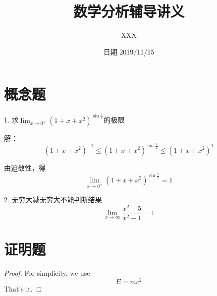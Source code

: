 \documentclass[12pt, a4paper]{ctexart}
\title{数学分析辅导讲义}
\date{日期 2019/11/15}
\author{XXX}
\begin{document}
\maketitle{}

\section{概念题}
    \begin{flushleft} %
    1. 求$
    \lim _{x \rightarrow 0^{+}}\left(1+x+x^{2}\right)^{\sin \frac{1}{x}}
    $的极限

    解：
    \[
    \left(1+x+x^{2}\right)^{-1} \leqslant\left(1+x+x^{2}\right)^{\sin \frac{1}{x}} \leqslant\left(1+x+x^{2}\right)^{1}
    \]

    由迫敛性，得$$\lim _{x \rightarrow 0^{+}} (1+x+x^2)^{\sin \frac{1}{x}} = 1$$


    2. 无穷大减无穷大不能判断结果
    \[
    \lim _{x \rightarrow \infty} \frac{x^{2}-5}{x^{2}-1}=1
    \]
    \end{flushleft}

\section{证明题}
    \begin{proof} %
    For simplicity, we use
    \[
    E=mc^2
    \]
    That's it.
    \end{proof}
\end{document}
